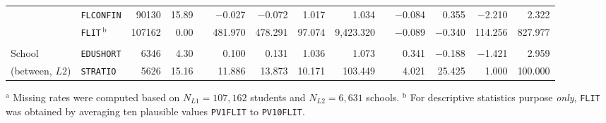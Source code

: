 {\begin{tabular}{llrr c@{\hskip 7.5mm} rrrr c@{\hskip 7.5mm} rrrr}
    & \texttt{FLCONFIN} & 90130 & 15.89 &       & $-$0.027 & $-$0.072 & 1.017 & 1.034 &       & $-$0.084 & 0.355 & $-$2.210 & 2.322 \\
    & \texttt{FLIT}$\, ^\text{b}$  & 107162 & 0.00  &       & 481.970 & 478.291 & 97.074 & 9,423.320 &       & $-$0.089 & $-$0.340 & 114.256 & 827.977 \\
    &       &       &       &       &       &       &       &       &       &       &       &       &  \\
    School & \texttt{EDUSHORT} & 6346  & 4.30  &       & 0.100 & 0.131 & 1.036 & 1.073 &       & 0.341 & $-$0.188 & $-$1.421 & 2.959 \\
    (between, $L2$) & \texttt{STRATIO} & 5626  & 15.16 &       & 11.886 & 13.873 & 10.171 & 103.449 &       & 4.021 & 25.425 & 1.000 & 100.000 \\
    \bottomrule
    \end{tabular}
}{$^\text{a}$ Missing rates were computed based on $N_{L1} = 107,162$ students and $N_{L2} = 6,631$ schools. $^\text{b}$ For descriptive statistics purpose \emph{only}, \texttt{FLIT} was obtained by averaging ten plausible values \texttt{PV1FLIT} to \texttt{PV10FLIT}.}
